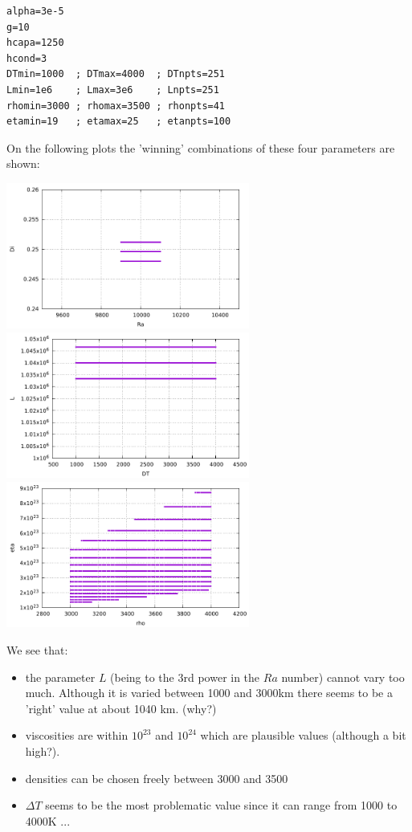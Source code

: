 \begin{lstlisting}
alpha=3e-5
g=10
hcapa=1250
hcond=3
DTmin=1000  ; DTmax=4000  ; DTnpts=251
Lmin=1e6    ; Lmax=3e6    ; Lnpts=251
rhomin=3000 ; rhomax=3500 ; rhonpts=41
etamin=19   ; etamax=25   ; etanpts=100
\end{lstlisting}


On the following plots the 'winning' combinations of these four parameters are shown:
\begin{center}
\includegraphics[width=8cm]{python_codes/fieldstone_compressible2/looking_for_Ra_Di/RaDi.pdf}
\includegraphics[width=8cm]{python_codes/fieldstone_compressible2/looking_for_Ra_Di/DTL.pdf}
\includegraphics[width=8cm]{python_codes/fieldstone_compressible2/looking_for_Ra_Di/rhoeta.pdf}
\end{center}

We see that:
\begin{itemize}
\item the parameter $L$ (being to the 3rd power in the $Ra$ number) cannot vary too much. Although it is 
varied between 1000 and 3000km there seems to be a 'right' value at about 1040 km. (why?)
\item viscosities are within $10^{23}$ and $10^{24}$ which are plausible values (although a bit high?).
\item densities can be chosen freely between 3000 and 3500
\item $\Delta T$ seems to be the most problematic value since it can range from 1000 to 4000K ...  
\end{itemize}


